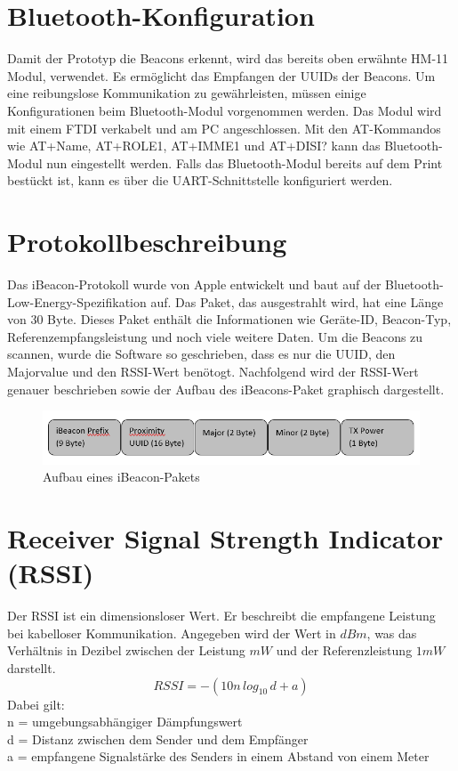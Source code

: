 \section{Bluetooth-Konfiguration}
Damit der Prototyp die Beacons erkennt, wird das bereits oben erwähnte HM-11 Modul, verwendet. Es ermöglicht das Empfangen der UUIDs der Beacons. Um eine reibungslose Kommunikation zu gewährleisten, müssen einige Konfigurationen beim Bluetooth-Modul vorgenommen werden. Das Modul wird mit einem FTDI verkabelt und am PC angeschlossen. Mit den AT-Kommandos wie AT+Name, AT+ROLE1, AT+IMME1 und AT+DISI? kann das Bluetooth-Modul nun eingestellt werden. Falls das Bluetooth-Modul bereits auf dem Print bestückt ist, kann es über die UART-Schnittstelle konfiguriert werden. 

\section{Protokollbeschreibung}
Das iBeacon-Protokoll wurde von Apple entwickelt und baut auf der Bluetooth-Low-Energy-Spezifikation auf. Das Paket, das ausgestrahlt wird, hat eine Länge von 30 Byte. Dieses Paket enthält die Informationen wie Geräte-ID, Beacon-Typ, Referenzempfangsleistung und noch viele weitere Daten. Um die Beacons zu scannen, wurde die Software so geschrieben, dass es nur die UUID, den Majorvalue und den RSSI-Wert benötogt. Nachfolgend wird der RSSI-Wert genauer beschrieben sowie der Aufbau des iBeacons-Paket graphisch dargestellt. \cite{Indoorpos}

\begin{figure}[htp]
\centering
\includegraphics[width=15cm]{Bilder/iBeacon_Paket.PNG}
\caption{Aufbau eines iBeacon-Pakets}
\label{fig:iBeacon}
\end{figure}

\section{Receiver Signal Strength Indicator (RSSI)}
Der RSSI ist ein dimensionsloser Wert. Er beschreibt die empfangene Leistung bei kabelloser Kommunikation. Angegeben wird der Wert in $dBm$, was das Verhältnis in Dezibel zwischen der Leistung $mW$ und der Referenzleistung $1mW$ darstellt.
\begin{equation}
    RSSI = -(10n\,log_{10}\,d+a)
\end{equation}
Dabei gilt: \\
\hspace*{10mm}
n = umgebungsabhängiger Dämpfungswert \\
\hspace*{10mm}
d = Distanz zwischen dem Sender und dem Empfänger \\
\hspace*{10mm}
a = empfangene Signalstärke des Senders in einem Abstand von einem Meter \\
\newpage
